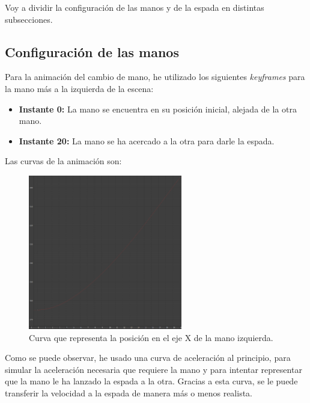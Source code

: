 Voy a dividir la configuración de las manos y de la espada en distintas subsecciones.

\newpage

\subsection{Configuración de las manos}

Para la animación del cambio de mano, he utilizado los siguientes \textit{keyframes} para la mano más a la izquierda de la escena:

\begin{itemize}
    \item \textbf{Instante 0: }La mano se encuentra en su posición inicial, alejada de la otra mano.
    \item \textbf{Instante 20: }La mano se ha acercado a la otra para darle la espada.
\end{itemize}

Las curvas de la animación son:

\begin{figure}[H]
   \centering
   \includegraphics[width=0.6\textwidth]{imagenes/manos/izquierda/posX.png}
   \caption{Curva que representa la posición en el eje X de la mano izquierda.}
\end{figure}



Como se puede observar, he usado una curva de aceleración al principio, para simular la aceleración necesaria que requiere la mano y para intentar representar que la mano le ha lanzado la espada a la otra. Gracias a esta curva, se le puede transferir la velocidad a la espada de manera más o menos realista.

